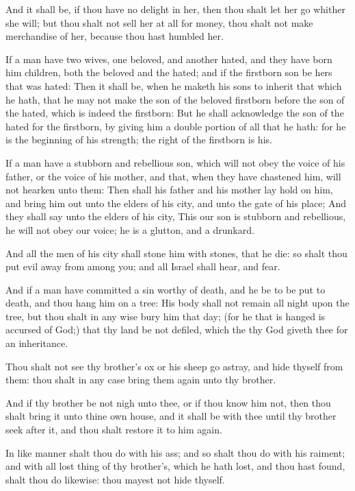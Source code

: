\Verse And it shall be, if thou have no delight in her, then thou shalt let her go whither she will; but thou shalt not sell her at all for money, thou shalt not make merchandise of her, because thou hast humbled her.

\Verse If a man have two wives, one beloved, and another hated, and they have born him children, both the beloved and the hated; and if the firstborn son be hers that was hated: \Verse Then it shall be, when he maketh his sons to inherit that which he hath, that he may not make the son of the beloved firstborn before the son of the hated, which is indeed the firstborn: \Verse But he shall acknowledge the son of the hated for the firstborn, by giving him a double portion of all that he hath: for he is the beginning of his strength; the right of the firstborn is his.

\Verse If a man have a stubborn and rebellious son, which will not obey the voice of his father, or the voice of his mother, and that, when they have chastened him, will not hearken unto them: \Verse Then shall his father and his mother lay hold on him, and bring him out unto the elders of his city, and unto the gate of his place; \Verse And they shall say unto the elders of his city, This our son is stubborn and rebellious, he will not obey our voice; he is a glutton, and a drunkard.

\Verse And all the men of his city shall stone him with stones, that he die: so shalt thou put evil away from among you; and all Israel shall hear, and fear.

\Verse And if a man have committed a sin worthy of death, and he be to be put to death, and thou hang him on a tree: \Verse His body shall not remain all night upon the tree, but thou shalt in any wise bury him that day; (for he that is hanged is accursed of God;) that thy land be not defiled, which the \LORD thy God giveth thee for an inheritance.


\Chapter
\Verse Thou shalt not see thy brother's ox or his sheep go astray, and hide thyself from them: thou shalt in any case bring them again unto thy brother.

\Verse And if thy brother be not nigh unto thee, or if thou know him not, then thou shalt bring it unto thine own house, and it shall be with thee until thy brother seek after it, and thou shalt restore it to him again.

\Verse In like manner shalt thou do with his ass; and so shalt thou do with his raiment; and with all lost thing of thy brother's, which he hath lost, and thou hast found, shalt thou do likewise: thou mayest not hide thyself.

